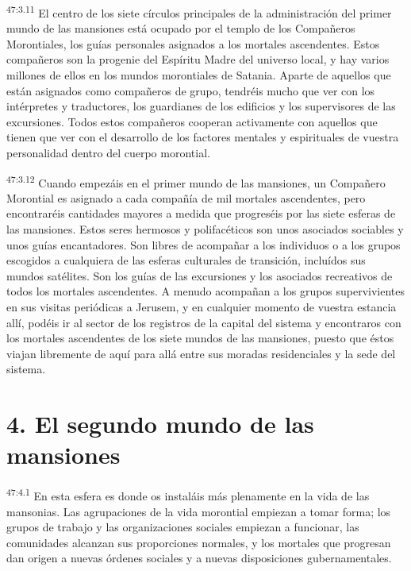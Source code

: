 \par
\textsuperscript{47:3.11} El centro de los siete círculos principales de la administración del primer mundo de las mansiones está ocupado por el templo de los Compañeros Morontiales, los guías personales asignados a los mortales ascendentes. Estos compañeros son la progenie del Espíritu Madre del universo local, y hay varios millones de ellos en los mundos morontiales de Satania. Aparte de aquellos que están asignados como compañeros de grupo, tendréis mucho que ver con los intérpretes y traductores, los guardianes de los edificios y los supervisores de las excursiones. Todos estos compañeros cooperan activamente con aquellos que tienen que ver con el desarrollo de los factores mentales y espirituales de vuestra personalidad dentro del cuerpo morontial.

\par
\textsuperscript{47:3.12} Cuando empezáis en el primer mundo de las mansiones, un Compañero Morontial es asignado a cada compañía de mil mortales ascendentes, pero encontraréis cantidades mayores a medida que progreséis por las siete esferas de las mansiones. Estos seres hermosos y polifacéticos son unos asociados sociables y unos guías encantadores. Son libres de acompañar a los individuos o a los grupos escogidos a cualquiera de las esferas culturales de transición, incluídos sus mundos satélites. Son los guías de las excursiones y los asociados recreativos de todos los mortales ascendentes. A menudo acompañan a los grupos supervivientes en sus visitas periódicas a Jerusem, y en cualquier momento de vuestra estancia allí, podéis ir al sector de los registros de la capital del sistema y encontraros con los mortales ascendentes de los siete mundos de las mansiones, puesto que éstos viajan libremente de aquí para allá entre sus moradas residenciales y la sede del sistema.

\section*{4. El segundo mundo de las mansiones}
\par
\textsuperscript{47:4.1} En esta esfera es donde os instaláis más plenamente en la vida de las mansonias. Las agrupaciones de la vida morontial empiezan a tomar forma; los grupos de trabajo y las organizaciones sociales empiezan a funcionar, las comunidades alcanzan sus proporciones normales, y los mortales que progresan dan origen a nuevas órdenes sociales y a nuevas disposiciones gubernamentales.


